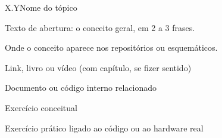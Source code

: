 \documentclass{nro-apostila}
\begin{document}
\begingroup\naocontarexercicios
\begin{tcolorbox}[enhanced, colback=white, colframe=nro-pia, boxrule=0.5pt, arc=0pt, left=5mm, right=5mm, top=4mm, bottom=3mm]
  {\fonttitulo\fontsize{14}{17}\selectfont\color{nro-axon}X.Y\hspace{2mm}\color{nro-tinta}Nome do tópico}\par\vspace{1mm}
  Texto de abertura: o conceito geral, em 2 a 3 frases.
  \begin{noproduto}
    Onde o conceito aparece nos repositórios ou esquemáticos.
  \end{noproduto}
  \begin{paraestudar}
    \item Link, livro ou vídeo (com capítulo, se fizer sentido)
    \item Documento ou código interno relacionado
  \end{paraestudar}
  \begin{pratique}
    \item Exercício conceitual
    \item Exercício prático ligado ao código ou ao hardware real
  \end{pratique}
\end{tcolorbox}
\endgroup

\end{document}
